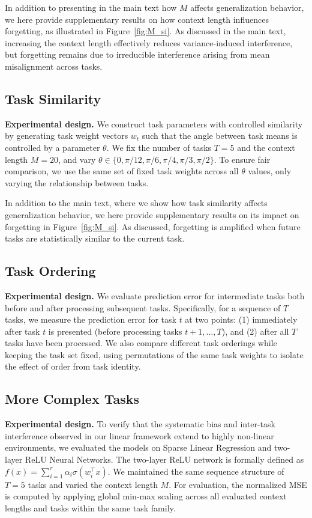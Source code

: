 \documentclass{article}
\theoremstyle{plain}
\theoremstyle{definition}
\theoremstyle{remark}
\begin{document}
In addition to presenting in the main text how $M$ affects generalization behavior, we here provide supplementary results on how context length influences forgetting, as illustrated in Figure~\ref{fig:M_si}. As discussed in the main text, increasing the context length effectively reduces variance-induced interference, but forgetting remains due to irreducible interference arising from mean misalignment across tasks.



\subsection{Task Similarity}
\noindent \textbf{Experimental design.}
We construct task parameters with controlled similarity by generating task weight vectors $w_t$ such that the angle between task means is controlled by a parameter $\theta$. We fix the number of tasks $T = 5$ and the context length $M = 20$, and vary $\theta \in \{0, \pi/12, \pi/6, \pi/4, \pi/3, \pi/2\}$. To ensure fair comparison, we use the same set of fixed task weights across all $\theta$ values, only varying the relationship between tasks.

In addition to the main text, where we show how task similarity affects generalization behavior, we here provide supplementary results on its impact on forgetting in Figure~\ref{fig:M_si}. As discussed, forgetting is amplified when future tasks are statistically similar to the current task. 


\subsection{Task Ordering}
\noindent \textbf{Experimental design.}
We evaluate prediction error for intermediate tasks both before and after processing subsequent tasks. Specifically, for a sequence of $T$ tasks, we measure the prediction error for task $t$ at two points: (1) immediately after task $t$ is presented (before processing tasks $t+1, \ldots, T$), and (2) after all $T$ tasks have been processed. We also compare different task orderings while keeping the task set fixed, using permutations of the same task weights to isolate the effect of order from task identity.

\subsection{More Complex Tasks}
\label{app:nonlinear}
\noindent \textbf{Experimental design.}
To verify that the systematic bias and inter-task interference observed in our linear framework extend to highly non-linear environments, we evaluated the models on Sparse Linear Regression and two-layer ReLU Neural Networks. The two-layer ReLU network is formally defined as $f(x) = \sum_{i=1}^{r}\alpha_{i}\sigma(w_{i}^{\top}x)$. We maintained the same sequence structure of $T=5$ tasks and varied the context length $M$. For evaluation, the normalized MSE is computed by applying global min-max scaling across all evaluated context lengths and tasks within the same task family.
\end{document}
